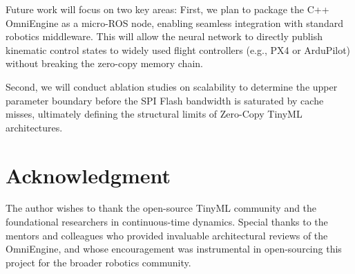\documentclass[conference]{IEEEtran}
\begin{document}
Future work will focus on two key areas: First, we plan to package the C++ OmniEngine as a micro-ROS node, enabling seamless integration with standard robotics middleware. This will allow the neural network to directly publish kinematic control states to widely used flight controllers (e.g., PX4 or ArduPilot) without breaking the zero-copy memory chain. 

Second, we will conduct ablation studies on scalability to determine the upper parameter boundary before the SPI Flash bandwidth is saturated by cache misses, ultimately defining the structural limits of Zero-Copy TinyML architectures.

\section*{Acknowledgment}
The author wishes to thank the open-source TinyML community and the foundational researchers in continuous-time dynamics. Special thanks to the mentors and colleagues who provided invaluable architectural reviews of the OmniEngine, and whose encouragement was instrumental in open-sourcing this project for the broader robotics community.
\end{document}
